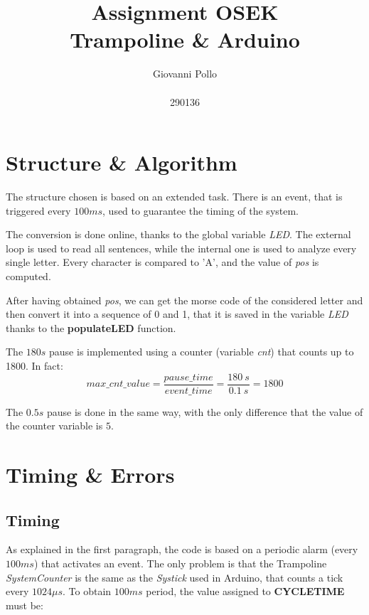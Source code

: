 \documentclass[a4paper]{article}
\title{\Huge Assignment OSEK \\ \LARGE Trampoline \& Arduino}
\author{\huge Giovanni Pollo \\ \\ \huge 290136}
\date{}
\begin{document}
\begin{titlepage}
  \centering
  \vspace{2px}
\end{titlepage}
\maketitle




\newpage


\section{Structure \& Algorithm}
The structure chosen is based on an extended task. There is an event, that is triggered every \(100ms\), used to guarantee the timing of the system.

The conversion is done online, thanks to the global variable \emph{LED}. The external loop is used to read all sentences, while the internal one is used to analyze every single letter. Every character is compared to 'A', and the value of \emph{pos} is computed.

After having obtained \emph{pos}, we can get the morse code of the considered letter and then convert it into a sequence of 0 and 1, that it is saved in the variable \emph{LED} thanks to the \textbf{populateLED} function.

The \(180s\) pause is implemented using a counter (variable \emph{cnt}) that counts up to 1800. In fact:
\begin{equation}
  max\_cnt\_value = \frac{pause\_time}{event\_time} = \frac{180\ s}{0.1\ s} = 1800
\end{equation}

The \(0.5s\) pause is done in the same way, with the only difference that the value of the counter variable is \(5\).


\section{Timing \& Errors}
\subsection{Timing} \label{Timing}

As explained in the first paragraph, the code is based on a periodic alarm (every \(100ms\)) that activates an event. The only problem is that the Trampoline \emph{SystemCounter} is the same as the \emph{Systick} used in Arduino, that counts a tick every \(1024 \mu s\). To obtain \(100ms\) period, the value assigned to  \textbf{CYCLETIME} must be:
\end{document}
